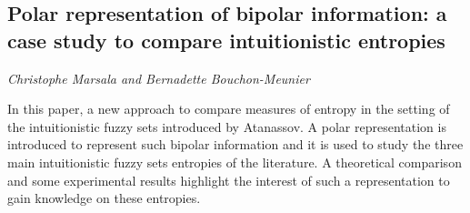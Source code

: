 \documentclass[../booklet.tex]{subfiles}
\begin{document}
\subsection[Polar representation of bipolar information: a case study to compare intuitionistic entropies. {\it Christophe Marsala and Bernadette Bouchon-Meunier}]{Polar representation of bipolar information: a case study to compare intuitionistic entropies}
 

\begin{center}
  {\it Christophe Marsala and Bernadette Bouchon-Meunier}
\end{center}

\vskip 0.8cm


  In this paper, a new approach to compare measures of entropy in the setting of the
  intuitionistic fuzzy sets introduced by Ata\-nas\-sov.  A polar representation is
  introduced to represent such bipolar information and it is used to study the three main
  intuitionistic fuzzy sets entropies of the literature. A theoretical comparison and some
  experimental results highlight the interest of such a representation to gain knowledge
  on these entropies.

\end{document}
